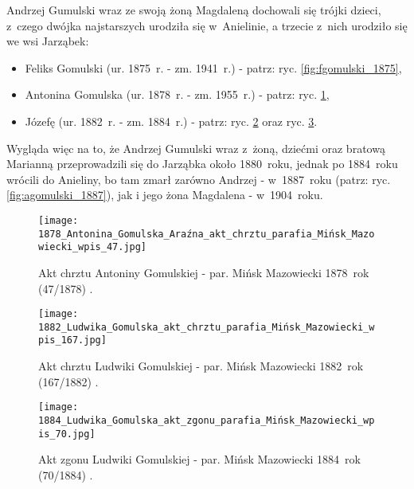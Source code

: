 Andrzej Gumulski wraz ze swoją żoną Magdaleną dochowali się trójki dzieci, 
z~czego dwójka najstarszych urodziła się w~Anielinie, a trzecie z~nich 
urodziło się we wsi Jarząbek: 

\begin{itemize}
    \item Feliks Gomulski (ur. 1875~r. - zm. 1941~r.) - patrz: ryc. 
    \ref{fig:fgomulski_1875},
    \item Antonina Gomulska (ur. 1878~r. - zm. 1955~r.) - patrz: ryc. 
    \ref{fig:agomulska_1878},
    \item Józefę (ur. 1882~r. - zm. 1884~r.)  - patrz: ryc. 
    \ref{fig:lgomulska_1882} oraz ryc. \ref{fig:lgomulska_1884}.
  \end{itemize}

Wygląda więc na to, że Andrzej Gumulski wraz z~żoną, dziećmi oraz 
bratową Marianną przeprowadzili się do Jarząbka około 1880~roku, jednak po 
1884~roku wrócili do Anieliny, bo tam zmarł zarówno Andrzej - w~1887~roku 
(patrz: ryc. \ref{fig:agomulski_1887}), jak i jego żona Magdalena - 
w~1904~roku.

\begin{figure}[!ht]
    \vspace*{0.5cm}
    \centering \texttt{[image: 
        1878\_Antonina\_Gomulska\_Araźna\_akt\_chrztu\_parafia\_Mińsk\_Mazowiecki\_wpis\_47.jpg]}
    \captionsetup{format=hang}
    \caption{Akt chrztu Antoniny Gomulskiej - par. Mińsk Mazowiecki 
    1878~rok (47/1878) \cite{par_minsk2}.}
    \label{fig:agomulska_1878}
\end{figure}

\begin{figure}[!ht]
    \vspace*{0.5cm}
    \centering \texttt{[image: 
        1882\_Ludwika\_Gomulska\_akt\_chrztu\_parafia\_Mińsk\_Mazowiecki\_wpis\_167.jpg]}
    \captionsetup{format=hang}
    \caption{Akt chrztu Ludwiki Gomulskiej - par. Mińsk Mazowiecki 
    1882~rok (167/1882) \cite{par_minsk2}.}
    \label{fig:lgomulska_1882}
\end{figure}

\begin{figure}[!ht]
    \vspace*{0.5cm}
    \centering \texttt{[image: 
        1884\_Ludwika\_Gomulska\_akt\_zgonu\_parafia\_Mińsk\_Mazowiecki\_wpis\_70.jpg]}
    \captionsetup{format=hang}
    \caption{Akt zgonu Ludwiki Gomulskiej - par. Mińsk Mazowiecki 
    1884~rok (70/1884) \cite{par_minsk2}.}
    \label{fig:lgomulska_1884}
\end{figure}

